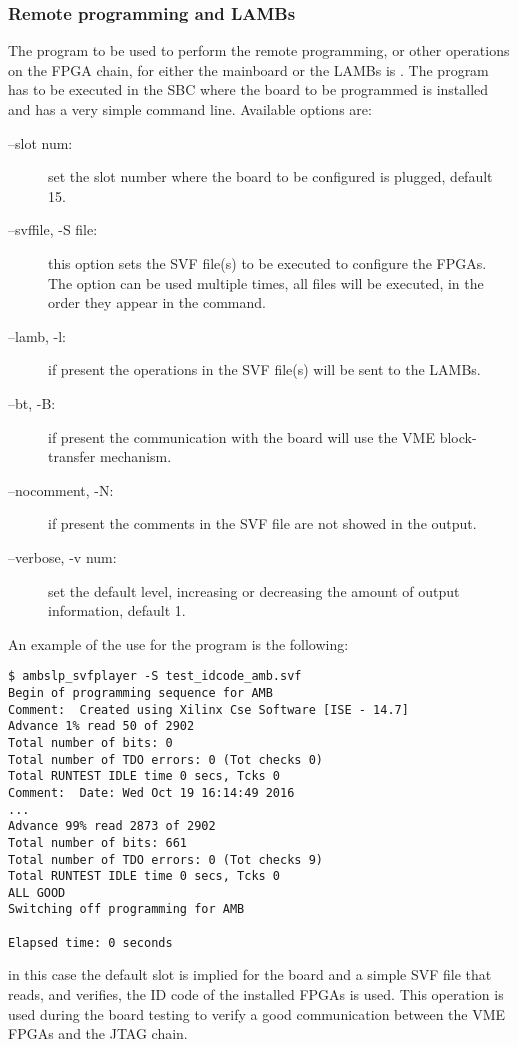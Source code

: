 \subsubsection{Remote programming \AMBoard and LAMBs}

The program to be used to perform the remote programming, or other operations
on the FPGA chain, for either the mainboard
or the LAMBs is \textbf{\texttt{}}. The program has to
be executed in the SBC where the board to be programmed is installed and has
a very simple command line. Available options are:
\begin{description}
\item[--slot num:] set the slot number where the board to be configured is
plugged, default 15.

\item[--svffile, -S file:] this option sets the SVF file(s) to be executed to
configure the FPGAs. The option can be used multiple times, all files will be
executed, in the order they appear in the command.

\item[--lamb, -l:] if present the operations in the SVF file(s) will be sent
to the LAMBs.

\item[--bt, -B:] if present the communication with the board will use the 
VME block-transfer mechanism.

\item[--nocomment, -N:] if present the comments in the SVF file are not
showed in the output.

\item[--verbose, -v num:] set the default level, increasing or decreasing
the amount of output information, default 1.
\end{description}

An example of the use for the program is the following:
\begin{verbatim}
$ ambslp_svfplayer -S test_idcode_amb.svf
Begin of programming sequence for AMB
Comment:  Created using Xilinx Cse Software [ISE - 14.7]
Advance 1% read 50 of 2902
Total number of bits: 0
Total number of TDO errors: 0 (Tot checks 0)
Total RUNTEST IDLE time 0 secs, Tcks 0
Comment:  Date: Wed Oct 19 16:14:49 2016
...
Advance 99% read 2873 of 2902
Total number of bits: 661
Total number of TDO errors: 0 (Tot checks 9)
Total RUNTEST IDLE time 0 secs, Tcks 0
ALL GOOD
Switching off programming for AMB

Elapsed time: 0 seconds
\end{verbatim}
in this case the default slot is implied for the board and a simple
SVF file that reads, and verifies, the ID code of the installed FPGAs is used.
This operation is used during the board testing to verify a good 
communication between the VME FPGAs and the JTAG chain. 

